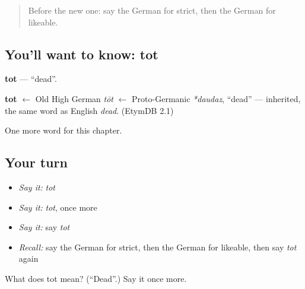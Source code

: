 \begin{quote}
Before the new one: say the German for strict, then the German for likeable.
\end{quote}

\subsection*{You'll want to know: tot}
\textbf{tot} — \textquotedblleft{}dead\textquotedblright{}.

\begin{cousinweb}
\textbf{tot} $\leftarrow$ Old High German \emph{tōt} $\leftarrow$ Proto-Germanic \emph{*daudaz}, \textquotedblleft{}dead\textquotedblright{} — inherited, the same word as English \emph{dead}. (EtymDB 2.1)
\end{cousinweb}

\begin{grammarlens}[title={What you've built}]
One more word for this chapter.
\end{grammarlens}

\subsection*{Your turn}
\begin{itemize}
\raggedright
  \item \emph{Say it:} \emph{tot}
  \item \emph{Say it:} \emph{tot}, once more
  \item \emph{Say it:} say \emph{tot}
  \item \emph{Recall:} say the German for strict, then the German for likeable, then say \emph{tot} again
\end{itemize}

\begin{tcolorbox}[breakable,colback=teal!4,colframe=teal!35!black,title={Before you move on}]
What does tot mean? (\textquotedblleft{}Dead\textquotedblright{}.) Say it once more.
\end{tcolorbox}
